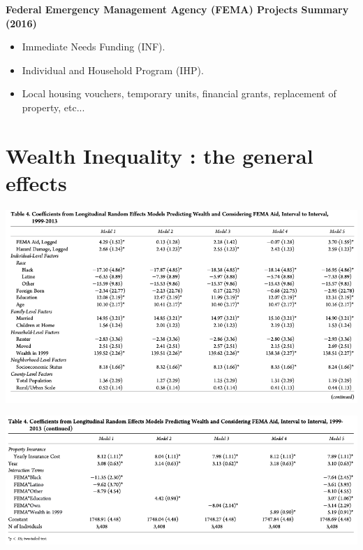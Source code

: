 \documentclass{beamer}
\begin{document}
\begin{frame}{\subsecname}
    \textbf{Federal Emergency Management Agency (FEMA) Projects Summary (2016)}
    \begin{itemize}
        \item Immediate Needs Funding (INF).
        \item Individual and Household Program (IHP).
        \item Local housing vouchers, temporary units, financial grants, replacement of property, etc...
    \end{itemize}
\end{frame}

\section{Wealth Inequality : the general effects}

    \begin{frame}{\secname}
        \includegraphics[totalheight=7cm,width=1\textwidth]{pictures/Table_4_1.png}
    \end{frame}

    \begin{frame}{\secname}
        \includegraphics[width=1\textwidth]{pictures/Table_4_2.png}
    \end{frame}
\end{document}
